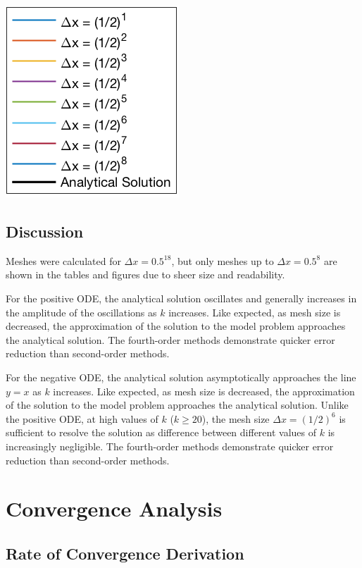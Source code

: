\documentclass[10pt, reqno]{article}		%
\numberwithin{equation}{section}
\begin{document}
\begin{center}
	\includegraphics[height = 0.25\linewidth]{legend}
\end{center}

\newpage

\subsection{Discussion}

Meshes were calculated for $\Delta x = 0.5^{18}$, but only meshes up to $\Delta x = 0.5^8$ are shown in the tables and figures due to sheer size and readability.

For the positive ODE, the analytical solution oscillates and generally increases in the amplitude of the oscillations as $k$ increases. Like expected, as mesh size is decreased, the approximation of the solution to the model problem approaches the analytical solution. The fourth-order methods demonstrate quicker error reduction than second-order methods.

For the negative ODE, the analytical solution asymptotically approaches the line $y = x$ as $k$ increases. Like expected, as mesh size is decreased, the approximation of the solution to the model problem approaches the analytical solution. Unlike the positive ODE, at high values of $k$ ($k \ge 20$), the mesh size $\Delta x = (1/2)^6$ is sufficient to resolve the solution as difference between different values of $k$ is increasingly negligible. The fourth-order methods demonstrate quicker error reduction than second-order methods.

\newpage

\section{Convergence Analysis}

\subsection{Rate of Convergence Derivation}
\end{document}
